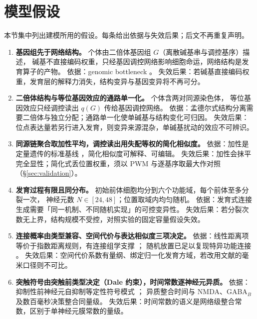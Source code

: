 \section{模型假设}\label{sec:assumptions}

本节集中列出建模所用的假设。每条给出依据与失效后果；后文不再重复声明。

\begin{enumerate}
  \item \textbf{基因组先于网络结构。} 个体由二倍体基因组 $G$（离散碱基串与调控基序）描述，
        碱基不直接编码权重，只经基因调控网络影响细胞命运，网络结构是发育算子的产物。
        依据：genomic bottleneck \citep{bib1_zador2019,bib3_shuvaev2024}。
        失效后果：若碱基直接编码权重，发育层的解释力消失，结构变异与基因变异将不再可分。

  \item \textbf{二倍体结构与等位基因效应的通路单一化。} 个体含两对同源染色体，
        等位基因效应只经调控读出 $q(G)$ 传给基因调控网络。
        依据：孟德尔式结构分离需要二倍体与独立分配；通路单一化使单碱基与结构变化可归因。
        失效后果：位点表达量若另行进入发育，则变异来源混杂，单碱基扰动的效应不可辨识。

  \item \textbf{同源链聚合取加性平均，调控读出用失配等权的简化相似度。}
        依据：加性是定量遗传的标准基线 \citep{bib138_fisher1918}，简化相似度可解释、可编辑。
        失效后果：加性会抹平完全显性；简化式丢位置权重，须以 PWM 与逐基序取最大作对照（\S\ref{sec:validation}）。

  \item \textbf{发育过程有限且同分布。} 初始前体细胞均分到六个功能域，每个前体至多分裂一次，
        神经元数 $N\in[24,48]$；位置取域内均匀随机。
        依据：发育式连接生成需要「同一机制、不同随机实现」的可控变异性。
        失效后果：若分裂次数无上界，结构规模不受控，对照实验的固定容量假设失效。

  \item \textbf{连接概率由类型兼容、空间代价与表达相似度三项决定。}
        依据：线性距离项等价于指数距离规则，有连接组学支撑 \citep{bib125_ercseyravasz2013}；
        随机放置已足以复现特异功能连接 \citep{bib123_hill2012}。
        失效后果：空间代价系数有量纲、绑定归一化发育方域，若改用文献的毫米口径则不可比。

  \item \textbf{突触符号由突触前类型决定（Dale 约束），时间常数逐神经元异质。}
        依据：抑制性前神经元自抑制等定性符号模式 \citep{bib14_dorkenwald2024}；
        异质整合时间与 NMDA、GABA$_B$ 及数百毫秒决策整合同量级。
        失效后果：时间常数的语义是网络级整合常数，区别于单神经元膜常数的量级。


\end{enumerate}
